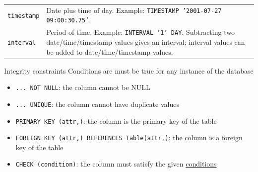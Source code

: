 \begin{knBox}
\begin{tabular}{|l|p{10cm}|}
        \texttt{timestamp}                       & Date plus time of day. Example: \texttt{TIMESTAMP '2001-07-27 09:00:30.75'}.                                                                                                  \\
        \texttt{interval}                        & Period of time. Example: \texttt{INTERVAL '1' DAY}. Subtracting two date/time/timestamp values gives an interval; interval values can be added to date/time/timestamp values. \\ \hline
    \end{tabular}

\end{knBox}

\begin{definition}
    {Integrity constraints}
    Conditions are must be true for any instance of the database

    \begin{itemize}
        \item \texttt{... NOT NULL}: the column cannot be NULL
        \item \texttt{... UNIQUE}: the column cannot have duplicate values
        \item \texttt{PRIMARY KEY (attr,)}: the column is the primary key of the table
        \item \texttt{FOREIGN KEY (attr,) REFERENCES Table(attr,)}: the column is a foreign key of the table
        \item \texttt{CHECK (condition)}: the column must satisfy the given \hyperref[conditions]{conditions}
    \end{itemize}

\end{definition}

